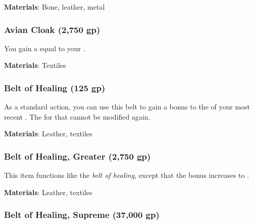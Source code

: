 \vspace{0.25em}
\textbf{Materials}: Bone, leather, metal


\lowercase{\hypertarget{item:Avian Cloak}{}}\label{item:Avian Cloak}
\hypertarget{item:Avian Cloak}{\subsubsection{Avian Cloak\hfill{} (2,750 gp)}}

You gain a  equal to your .



\vspace{0.25em}
\textbf{Materials}: Textiles


\lowercase{\hypertarget{item:Belt of Healing}{}}\label{item:Belt of Healing}
\hypertarget{item:Belt of Healing}{\subsubsection{Belt of Healing\hfill{} (125 gp)}}

As a standard action, you can use this belt to gain a  bonus to the  of your most recent .
The  for that  cannot be modified again.



\vspace{0.25em}
\textbf{Materials}: Leather, textiles


\lowercase{\hypertarget{item:Belt of Healing, Greater}{}}\label{item:Belt of Healing, Greater}
\hypertarget{item:Belt of Healing, Greater}{\subsubsection{Belt of Healing, Greater\hfill{} (2,750 gp)}}

This item functions like the \textit{belt of healing}, except that the bonus increases to .



\vspace{0.25em}
\textbf{Materials}: Leather, textiles


\lowercase{\hypertarget{item:Belt of Healing, Supreme}{}}\label{item:Belt of Healing, Supreme}
\hypertarget{item:Belt of Healing, Supreme}{\subsubsection{Belt of Healing, Supreme\hfill{} (37,000 gp)}}

